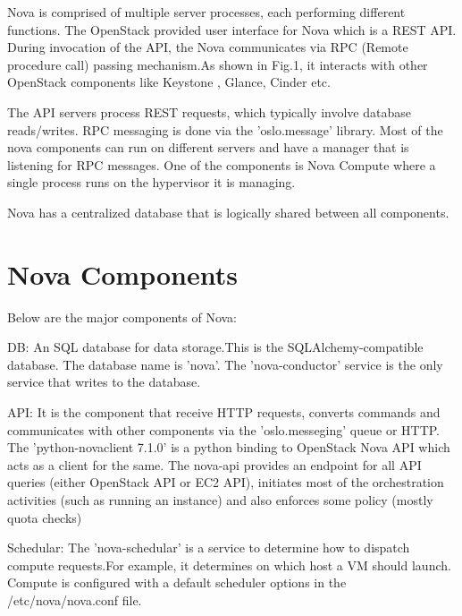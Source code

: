 \documentclass[9pt,twocolumn,twoside]{../../styles/osajnl}
\begin{document}
Nova is comprised of multiple server processes, each performing different functions. The OpenStack provided user interface for Nova which is a REST API. During invocation of the API, the Nova communicates via  RPC (Remote procedure call) passing mechanism.As shown in Fig.1, it interacts with other OpenStack components like Keystone , Glance, Cinder etc.

The API servers process REST requests, which typically involve database reads/writes. RPC messaging is done via the 'oslo.message' library. Most of the nova components can run on different servers and have a manager that is listening for RPC messages. One of the components is Nova Compute where a single process runs on the hypervisor it is managing.

Nova has a centralized database that is logically  shared between all components\cite{www-nova-pepple}.


\section{Nova Components}

Below are the major components of Nova:


\begin{flushleft}


DB: An SQL database for data storage.This is the SQLAlchemy-compatible database. The database name is 'nova'. The 'nova-conductor' service is the only service that writes to the database. 
\end{flushleft}

\begin{flushleft}
\item API: It is the component that receive HTTP requests, converts commands and communicates with other components via the 'oslo.messeging' queue or HTTP.
The 'python-novaclient 7.1.0' is a python binding to OpenStack Nova API which acts as a client for the same. The nova-api provides an endpoint for all API queries (either OpenStack API or EC2 API), initiates most of the orchestration activities (such as running an instance) and also enforces some policy (mostly quota checks)
\end{flushleft}

\begin{flushleft}

Schedular: The 'nova-schedular' is a service to determine how to dispatch compute requests.For example, it determines on which host a VM should launch. Compute is configured with a default scheduler options in the /etc/nova/nova.conf file\cite{www-nova-schedular}.
\end{flushleft}
\end{document}
